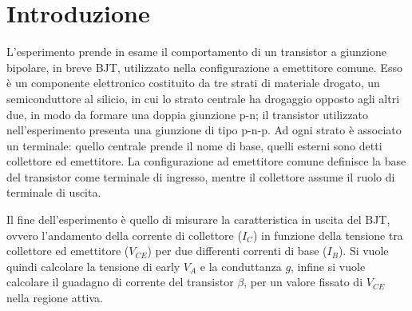 \documentclass[../main.tex]{subfiles}
\begin{document}
    \section{Introduzione} \label{sec:introduzione}


    L'esperimento prende in esame il comportamento di un transistor a giunzione bipolare,
    in breve BJT, utilizzato nella configurazione a emettitore comune. Esso è un componente
    elettronico costituito da tre strati di materiale drogato,
    un semiconduttore al silicio, in cui lo strato centrale ha drogaggio opposto agli
    altri due, in modo da formare una doppia giunzione p-n; il transistor
    utilizzato nell'esperimento presenta una giunzione di tipo p-n-p. Ad ogni strato è associato
    un terminale: quello centrale prende il nome di base,
    quelli esterni sono detti collettore ed emettitore. La configurazione ad emettitore
    comune definisce la base del transistor come terminale di ingresso, mentre il
    collettore assume il ruolo di terminale di uscita. \newline

    Il fine dell'esperimento è quello di misurare la caratteristica in uscita del BJT,
    ovvero l'andamento della corrente di collettore ($I_C$) in funzione della tensione
    tra collettore ed emettitore ($V_{CE}$) per due differenti correnti di base ($I_B$). Si vuole
    quindi calcolare la tensione di early $V_A$ e la conduttanza $g$, infine si
    vuole calcolare il guadagno di corrente del transistor $\beta$, per un valore fissato di $V_{CE}$
    nella regione attiva.


%
\end{document}
